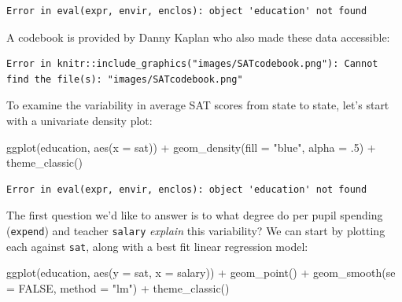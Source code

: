 \documentclass[
  letterpaper,
  DIV=11,
  numbers=noendperiod]{scrreprt}
\newenvironment{Shaded}{\begin{snugshade}}{\end{snugshade}}
\newcommand{\AttributeTok}[1]{\textcolor[rgb]{0.40,0.45,0.13}{#1}}
\newcommand{\ConstantTok}[1]{\textcolor[rgb]{0.56,0.35,0.01}{#1}}
\newcommand{\DecValTok}[1]{\textcolor[rgb]{0.68,0.00,0.00}{#1}}
\newcommand{\FunctionTok}[1]{\textcolor[rgb]{0.28,0.35,0.67}{#1}}
\newcommand{\NormalTok}[1]{\textcolor[rgb]{0.00,0.23,0.31}{#1}}
\newcommand{\SpecialCharTok}[1]{\textcolor[rgb]{0.37,0.37,0.37}{#1}}
\newcommand{\StringTok}[1]{\textcolor[rgb]{0.13,0.47,0.30}{#1}}
\begin{document}
\begin{verbatim}
Error in eval(expr, envir, enclos): object 'education' not found
\end{verbatim}

A codebook is provided by Danny Kaplan who also made these data
accessible:

\begin{verbatim}
Error in knitr::include_graphics("images/SATcodebook.png"): Cannot find the file(s): "images/SATcodebook.png"
\end{verbatim}

To examine the variability in average SAT scores from state to state,
let's start with a univariate density plot:

\begin{Shaded}
\begin{Highlighting}[]
\FunctionTok{ggplot}\NormalTok{(education, }\FunctionTok{aes}\NormalTok{(}\AttributeTok{x =}\NormalTok{ sat)) }\SpecialCharTok{+}
  \FunctionTok{geom\_density}\NormalTok{(}\AttributeTok{fill =} \StringTok{"blue"}\NormalTok{, }\AttributeTok{alpha =}\NormalTok{ .}\DecValTok{5}\NormalTok{) }\SpecialCharTok{+} 
  \FunctionTok{theme\_classic}\NormalTok{()}
\end{Highlighting}
\end{Shaded}

\begin{verbatim}
Error in eval(expr, envir, enclos): object 'education' not found
\end{verbatim}

The first question we'd like to answer is to what degree do per pupil
spending (\texttt{expend}) and teacher \texttt{salary} \emph{explain}
this variability? We can start by plotting each against \texttt{sat},
along with a best fit linear regression model:

\begin{Shaded}
\begin{Highlighting}[]
\FunctionTok{ggplot}\NormalTok{(education, }\FunctionTok{aes}\NormalTok{(}\AttributeTok{y =}\NormalTok{ sat, }\AttributeTok{x =}\NormalTok{ salary)) }\SpecialCharTok{+}
  \FunctionTok{geom\_point}\NormalTok{() }\SpecialCharTok{+}
  \FunctionTok{geom\_smooth}\NormalTok{(}\AttributeTok{se =} \ConstantTok{FALSE}\NormalTok{, }\AttributeTok{method =} \StringTok{"lm"}\NormalTok{) }\SpecialCharTok{+} 
  \FunctionTok{theme\_classic}\NormalTok{()}
\end{Highlighting}
\end{Shaded}
\end{document}

